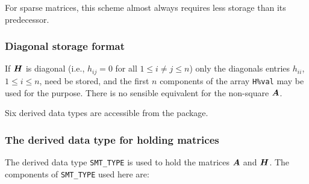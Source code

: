 \documentclass{galahad}
\begin{document}
For sparse matrices, this scheme almost always requires less storage than 
its predecessor.

\subsubsection{Diagonal storage format}\label{diagonal}
If ${\bm{H}}$ is diagonal (i.e., $h_{ij} = 0$ for all $1 \leq i \neq j \leq n$)
only the diagonals entries $h_{ii}$, $1 \leq i \leq n$,  need be stored,
and the first $n$ components of the array {\tt H\%val} may be used for 
the purpose. There is no sensible equivalent for the non-square ${\bm{A}}$.








\galtypes
Six derived data types are accessible from the package.


\subsubsection{The derived data type for holding matrices}\label{typesmt}
The derived data type {\tt SMT\_TYPE} is used to hold the matrices ${\bm{A}}$
and ${\bm{H}}$. The components of {\tt SMT\_TYPE} used here are:
\end{document}
